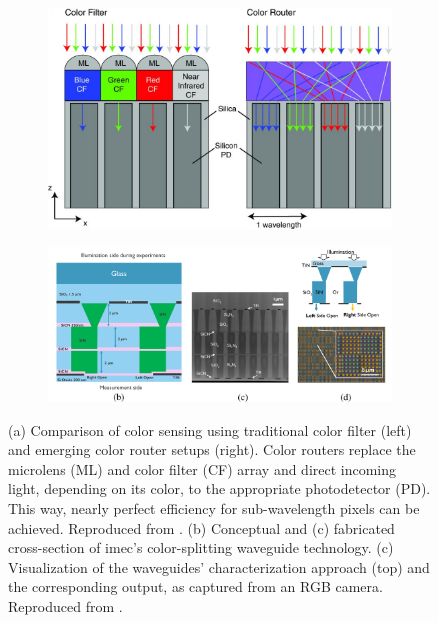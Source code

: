 \begin{figure}[ht!]
    \centering
    \begin{subfigure}[t]{0.6\textwidth} %
        \centering
        \includegraphics[width=\textwidth]{chapters/introduction/image/color_router.jpg} %
        \caption{}
        \label{fig:ch1:color_routing_concept}
    \end{subfigure}
    \hfill %
    
    \begin{subfigure}[t]{0.99\textwidth} %
        \centering
        \includegraphics[width=\textwidth]{chapters/introduction/image/gigapixel_idea.pdf} %
    
    \end{subfigure}

    \caption[Introduction and implementation of color splitting technology.]{(a) Comparison of color sensing using traditional color filter (left) and emerging color router setups (right). Color routers replace the microlens (ML) and color filter (CF) array and direct incoming light, depending on its color, to the appropriate photodetector (PD). This way, nearly perfect efficiency for sub-wavelength pixels can be achieved. Reproduced from \cite{Zhao2021PerfectPixels}. (b) Conceptual and (c) fabricated cross-section of imec's color-splitting waveguide technology. (c) Visualization of the waveguides' characterization approach (top) and the corresponding  output, as captured from an RGB camera. Reproduced from \cite{Kang2017HighCsPbBr3}.}
    \label{fig:ch1:color_splitting}
\end{figure}

